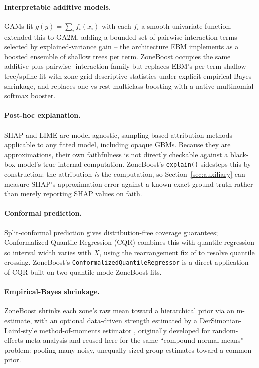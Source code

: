 \documentclass[11pt]{article}
\begin{document}
\paragraph{Interpretable additive models.} GAMs \citep{hastie1986gam} fit
$g(y) = \sum_i f_i(x_i)$ with each $f_i$ a smooth univariate function.
\citet{lou2013ga2m} extended this to GA2M, adding a bounded set of pairwise
interaction terms selected by explained-variance gain -- the architecture EBM
\citep{nori2019interpretml} implements as a boosted ensemble of shallow
trees per term. ZoneBoost occupies the same additive-plus-pairwise-
interaction family but replaces EBM's per-term shallow-tree/spline fit with
zone-grid descriptive statistics under explicit empirical-Bayes shrinkage,
and replaces one-vs-rest multiclass boosting with a native multinomial
softmax booster.

\paragraph{Post-hoc explanation.} SHAP \citep{lundberg2017shap} and LIME
\citep{ribeiro2016lime} are model-agnostic, sampling-based attribution
methods applicable to any fitted model, including opaque GBMs. Because they
are approximations, their own faithfulness is not directly checkable against
a black-box model's true internal computation. ZoneBoost's \texttt{explain()}
sidesteps this by construction: the attribution \emph{is} the computation,
so Section~\ref{sec:auxiliary} can measure SHAP's approximation error against
a known-exact ground truth rather than merely reporting SHAP values on
faith.

\paragraph{Conformal prediction.} Split-conformal prediction gives
distribution-free coverage guarantees; Conformalized Quantile Regression
(CQR) \citep{romano2019cqr} combines this with quantile regression so
interval width varies with $X$, using the rearrangement fix of
\citet{chernozhukov2010rearrangement} to resolve quantile crossing.
ZoneBoost's \texttt{ConformalizedQuantileRegressor} is a direct application of
CQR built on two quantile-mode ZoneBoost fits.

\paragraph{Empirical-Bayes shrinkage.} ZoneBoost shrinks each zone's raw
mean toward a hierarchical prior via an m-estimate, with an optional
data-driven strength estimated by a DerSimonian-Laird-style
method-of-moments estimator \citep{dersimonian1986metaanalysis}, originally
developed for random-effects meta-analysis and reused here for the same
``compound normal means'' problem: pooling many noisy, unequally-sized group
estimates toward a common prior.
\end{document}
